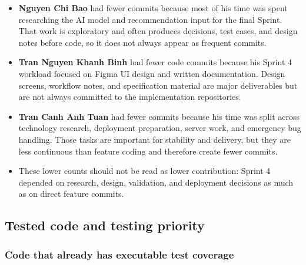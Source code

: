 \documentclass[12pt]{article}
\begin{document}
\begin{itemize}

\item \textbf{Nguyen Chi Bao} had fewer commits because most of his time was spent researching the AI model and recommendation input for the final Sprint. That work is exploratory and often produces decisions, test cases, and design notes before code, so it does not always appear as frequent commits.

\item \textbf{Tran Nguyen Khanh Binh} had fewer code commits because his Sprint 4 workload focused on Figma UI design and written documentation. Design screens, workflow notes, and specification material are major deliverables but are not always committed to the implementation repositories.

\item \textbf{Tran Canh Anh Tuan} had fewer commits because his time was split across technology research, deployment preparation, server work, and emergency bug handling. Those tasks are important for stability and delivery, but they are less continuous than feature coding and therefore create fewer commits.

\item These lower counts should not be read as lower contribution: Sprint 4 depended on research, design, validation, and deployment decisions as much as on direct feature commits.

\end{itemize}

\subsection{Tested code and testing priority}

\subsubsection{Code that already has executable test coverage}
\end{document}
